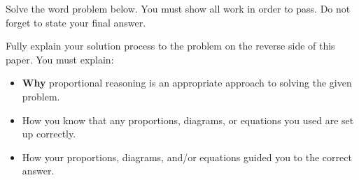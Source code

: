 
Solve the word problem below. You must show all work in order to pass. Do not forget to state your final answer.

\begin{statement}
\end{statement}

\begin{ansenv}
    \vspace{12pt}
\end{ansenv}

\newpage
{}

Fully explain your solution process to the problem on the reverse side of this paper. You must explain:
\begin{itemize}
    \item \textbf{Why} proportional reasoning is an appropriate approach to solving the given problem.
    \item How you know that any proportions, diagrams, or equations you used are set up correctly.
    \item How your proportions, diagrams, and/or equations guided you to the correct answer.
\end{itemize}